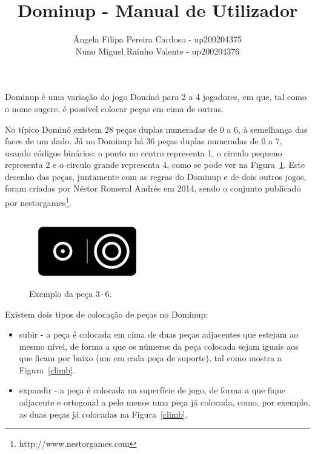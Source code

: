 \documentclass[a4paper]{article}
\begin{document}

\title{\Huge\textbf{Dominup - Manual de Utilizador}}
\author{
Ângela Filipa Pereira Cardoso - up200204375 \\
Nuno Miguel Rainho Valente - up200204376 \\
}

\maketitle

Dominup é uma variação do jogo Dominó para 2 a 4 jogadores, em que, tal como o nome sugere, é possível colocar peças em cima de outras.

No típico Dominó existem 28 peças duplas numeradas de 0 a 6, à semelhança das faces de um dado. Já no Dominup há 36 peças duplas numeradas de 0 a 7, usando códigos binários: o ponto no centro representa 1, o circulo pequeno representa 2 e o circulo grande representa 4, como se pode ver na Figura~\ref{piece}. Este desenho das peças, juntamente com as regras do Dominup e de dois outros jogos, foram criadas por Néstor Romeral Andrés em 2014, sendo o conjunto publicado por nestorgames\footnote[1]{http://www.nestorgames.com}.

\begin{figure}[htbp]
\begin{center}
\includegraphics[scale=0.4]{piece.jpg}
\caption{Exemplo da peça $3 \cdot 6$.}
\label{piece}
\end{center}
\end{figure}

Existem dois tipos de colocação de peças no Dominup:
\begin{itemize}
	\item subir - a peça é colocada em cima de duas peças adjacentes que estejam ao mesmo nível, de forma a que os números da peça colocada sejam iguais aos que ficam por baixo (um em cada peça de suporte), tal como mostra a Figura~\ref{climb}.
	\item expandir - a peça é colocada na superfície de jogo, de forma a que fique adjacente e ortogonal a pelo menos uma peça já colocada, como, por exemplo, as duas peças já colocadas na Figura~\ref{climb}.
\end{itemize}
\end{document}
